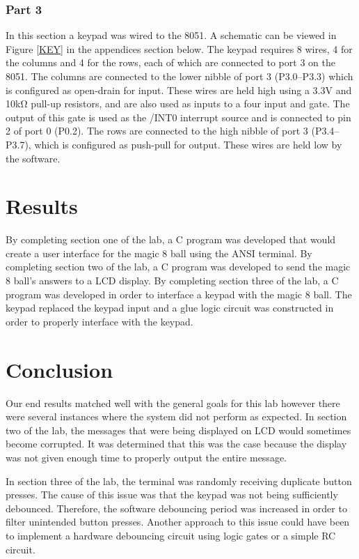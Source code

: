 \documentclass[12pt]{article}
\begin{document}
\subsubsection{Part 3}
In this section a keypad was wired to the 8051. A schematic can be viewed in Figure \ref{KEY} in the appendices section below. The keypad requires 8 wires, 4 for the columns and 4 for the rows, each of which are connected to port 3 on the 8051. The columns are connected to the lower nibble of port 3 (P3.0--P3.3) which is configured as open-drain for input. These wires are held high using a 3.3\si{V} and 10k\si{\ohm} pull-up resistors, and are also used as inputs to a four input and gate. The output of this gate is used as the /INT0 interrupt source and is connected to pin 2 of port 0 (P0.2). The rows are connected to the high nibble of port 3 (P3.4--P3.7), which is configured as push-pull for output. These wires are held low by the software. 

\section{Results}
By completing section one of the lab, a C program was developed that would create a user interface for the magic 8 ball using the ANSI terminal. By completing section two of the lab, a C program was developed to send the magic 8 ball’s answers to a LCD display. By completing section three of the lab, a C program was developed in order to interface a keypad with the magic 8 ball. The keypad replaced the keypad input and a glue logic circuit was constructed in order to properly interface with the keypad. 	


\section{Conclusion}
Our end results matched well with the general goals for this lab however there were several instances where the system did not perform as expected. In section two of the lab, the messages that were being displayed on LCD would sometimes become corrupted. It was determined that this was the case because the display was not given enough time to properly output the entire message. 

In section three of the lab, the terminal was randomly receiving duplicate button presses. The cause of this issue was that the keypad was not being sufficiently debounced. Therefore, the software debouncing period was increased in order to filter unintended button presses. Another approach to this issue could have been to implement a hardware debouncing circuit using logic gates or a simple RC circuit. 
 
\end{document}
